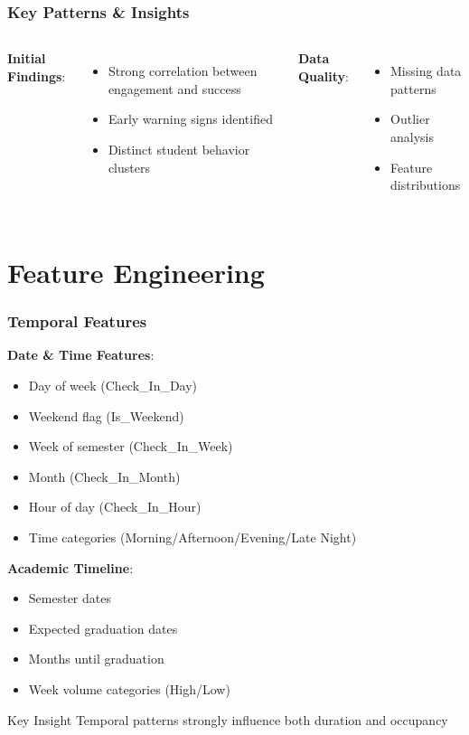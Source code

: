 \documentclass{beamer}
\begin{document}
\begin{frame}
\frametitle{Key Patterns & Insights}
    \begin{columns}
        \textbf{Initial Findings}:
            \begin{itemize}
            \item Strong correlation between engagement and success
            \item Early warning signs identified
            \item Distinct student behavior clusters
            \end{itemize}
            
        \textbf{Data Quality}:
            \begin{itemize}
            \item Missing data patterns
            \item Outlier analysis
            \item Feature distributions
            \end{itemize}
                
    \end{columns}
\end{frame}

\section{Feature Engineering}

\begin{frame}
\frametitle{Temporal Features}
    \textbf{Date \& Time Features}:
        \begin{itemize}
        \item Day of week (Check\_In\_Day)
        \item Weekend flag (Is\_Weekend)
        \item Week of semester (Check\_In\_Week)
        \item Month (Check\_In\_Month)
        \item Hour of day (Check\_In\_Hour)
        \item Time categories (Morning/Afternoon/Evening/Late Night)
        \end{itemize}
    
    \textbf{Academic Timeline}:
        \begin{itemize}
        \item Semester dates
        \item Expected graduation dates
        \item Months until graduation
        \item Week volume categories (High/Low)
        \end{itemize}

    \begin{alertblock}{Key Insight}
        Temporal patterns strongly influence both duration and occupancy
    \end{alertblock}
\end{frame}
\end{document}
